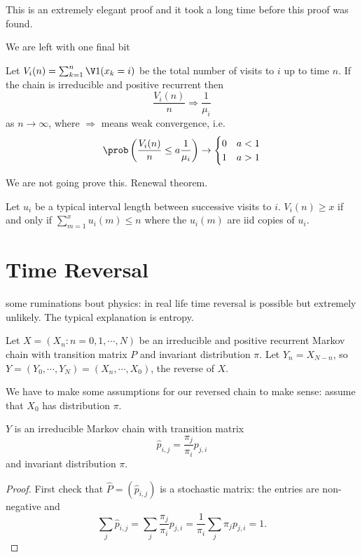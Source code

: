 \documentclass[a4paper]{article}
\begin{document}
This is an extremely elegant proof and it took a long time before this proof was found.

We are left with one final bit 

\begin{theorem}
  Let \(V_i(n) = \sum_{k = 1}^n \V 1(x_k = i)\) be the total number of visits to \(i\) up to time \(n\). If the chain is irreducible and positive recurrent then
  \[
    \frac{V_i(n)}{n} \Rightarrow \frac{1}{\mu_i}
  \]
  as \(n \to \infty\), where \(\Rightarrow\) means weak convergence, i.e.
  \[
    \prob \left( \frac{V_i(n)}{n} \leq a\frac{1}{\mu_i} \right) \to
    \begin{cases}
      0 & a < 1 \\
      1 & a > 1
    \end{cases}
  \]
\end{theorem}

We are not going prove this. Renewal theorem.

\begin{remark}
  Let \(u_i\) be a typical interval length between successive visits to \(i\). \(V_i(n) \geq x\) if and only if \(\sum_{m = 1}^x u_i(m) \leq n\) where the \(u_i(m)\) are iid copies of \(u_i\).
\end{remark}

\section{Time Reversal}

some ruminations bout physics: in real life time reversal is possible but extremely unlikely. The typical explanation is entropy.

Let \(X = (X_n: n = 0, 1, \cdots, N)\) be an irreducible and positive recurrent Markov chain with transition matrix \(P\) and invariant distribution \(\pi\). Let \(Y_n = X_{N - n}\), so \(Y = (Y_0, \cdots, Y_N) = (X_n, \cdots, X_0)\), the reverse of \(X\).

We have to make some assumptions for our reversed chain to make sense: assume that \(X_0\) has distribution \(\pi\).

\begin{theorem}
  \(Y\) is an irreducible Markov chain with transition matrix
  \[
    \hat p_{i,j} = \frac{\pi_j}{\pi_i} p_{j, i}
  \]
  and invariant distribution \(\pi\).
\end{theorem}

\begin{proof}
  First check that \(\hat P = (\hat p_{i,j})\) is a stochastic matrix: the entries are non-negative and
  \[
    \sum_j \hat p_{i,j} = \sum_j \frac{\pi_j}{\pi_i} p_{j, i} = \frac{1}{\pi_i} \sum_j \pi_j p_{j,i} = 1.
  \]
\end{proof}

\iffalse
\appendix

\section{Resources}


Reading list: Probability, an introduction Grimmett, Welsh, 2nd edition, Chapter 12

\fi
\end{document}
